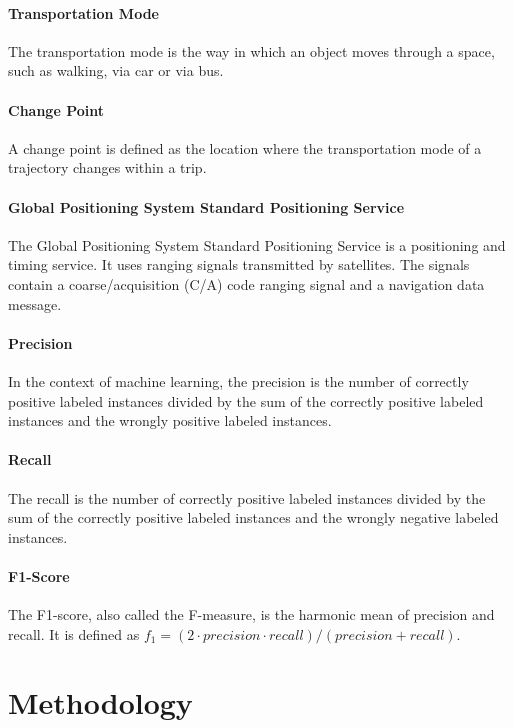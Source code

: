 \paragraph{Transportation Mode} The transportation mode is the way in which an object moves through a space, such as walking, via car or via bus.  \cite{Bolbol2012}


\paragraph{Change Point} A change point is defined as the location where the transportation mode of a trajectory changes within a trip. \cite{Zheng2008}

\paragraph{Global Positioning System Standard Positioning Service} The Global Positioning System Standard Positioning Service is a positioning and timing service. It uses ranging signals transmitted by satellites. The signals contain a  coarse/acquisition (C/A)  code  ranging  signal and a navigation data message. 
\cite{dod2008global}


\paragraph{Precision} In the context of machine learning, the precision is the number of correctly positive labeled instances divided by the sum of the correctly positive labeled instances and the wrongly positive labeled instances. \cite{davis2006relationship}

\paragraph{Recall} The recall is the number of correctly positive labeled instances divided by the sum of the correctly positive labeled instances and the wrongly negative labeled instances. \cite{davis2006relationship}

\paragraph{F1-Score} The F1-score, also called the F-measure, is the harmonic mean of precision and recall. It is defined as $f_1 = (2 \cdot precision \cdot recall) / (precision + recall)$. \cite{sasaki2007truth}


\section{Methodology}

